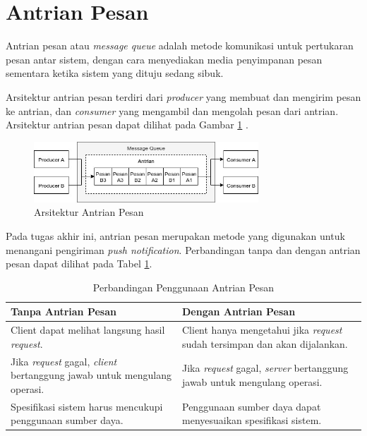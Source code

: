 \section{Antrian Pesan}
\par Antrian pesan atau \textit{message queue} adalah metode komunikasi untuk pertukaran pesan antar sistem, dengan cara menyediakan media penyimpanan pesan sementara ketika sistem yang dituju sedang sibuk.
\par Arsitektur antrian pesan terdiri dari \textit{producer} yang membuat dan mengirim pesan ke antrian, dan \textit{consumer} yang mengambil dan mengolah pesan dari antrian. Arsitektur antrian pesan dapat dilihat pada Gambar \ref{img:arsitektur-mq_pnt} \cite{message-queue-online}.
\begin{figure}[H]
	\centering\includegraphics[width=0.75\textwidth]{bab2/img/arsitektur-mq_pnt.jpg}
	\caption{Arsitektur Antrian Pesan}
	\label{img:arsitektur-mq_pnt}
\end{figure}
\par Pada tugas akhir ini, antrian pesan merupakan metode yang digunakan untuk menangani pengiriman \textit{push notification}. Perbandingan tanpa dan dengan antrian pesan dapat dilihat pada Tabel \ref{t:perbandingan-antrian-pesan}.
\begin{longtable}{|p{4.5cm}|p{4.5cm}|}
	\caption{Perbandingan Penggunaan Antrian Pesan} \label{t:perbandingan-antrian-pesan} \\ \hline
	\rowcolor{lightgray} Tanpa Antrian Pesan & Dengan Antrian Pesan \\ \hline
	Client dapat melihat langsung hasil \textit{request}. & Client hanya mengetahui jika \textit{request} sudah tersimpan dan akan dijalankan. \\ \hline
	Jika \textit{request} gagal, \textit{client} bertanggung jawab untuk mengulang operasi. & Jika \textit{request} gagal, \textit{server} bertanggung jawab untuk mengulang operasi. \\ \hline
	Spesifikasi sistem harus mencukupi penggunaan sumber daya. & Penggunaan sumber daya dapat menyesuaikan spesifikasi sistem. \\ \hline
\end{longtable}

